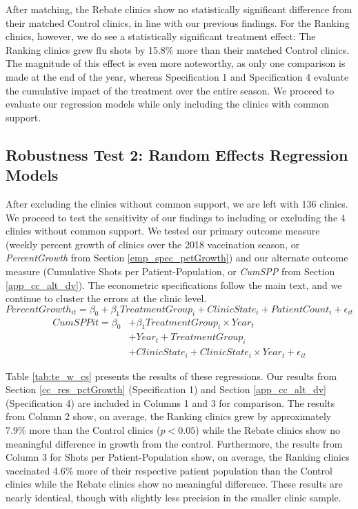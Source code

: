 After matching, the Rebate clinics show no statistically significant difference from their matched Control clinics, in line with our previous findings. For the Ranking clinics, however, we do see a statistically significant treatment effect: The Ranking clinics grew flu shots by 15.8\% more than their matched Control clinics. The magnitude of this effect is even more noteworthy, as only one comparison is made at the end of the year, whereas Specification 1 and Specification 4 evaluate the cumulative impact of the treatment over the entire season. We proceed to evaluate our regression models while only including the clinics with common support.

\subsection*{Robustness Test 2: Random Effects Regression Models} 
After excluding the clinics without common support, we are left with 136 clinics. We proceed to test the sensitivity of our findings to including or excluding the 4 clinics without common support. We tested our primary outcome measure (weekly percent growth of clinics over the 2018 vaccination season, or \textit{PercentGrowth} from Section \ref{emp_spec_pctGrowth}) and our alternate outcome measure (Cumulative Shots per Patient-Population, or \textit{CumSPP} from Section \ref{app_cc_alt_dv}). The econometric specifications follow the main text, and we continue to cluster the errors at the clinic level.
  \begin{equation} \tag{1} %
      PercentGrowth_{it} = \beta_0 + \beta_1 TreatmentGroup_i + ClinicState_i + PatientCount_i + \epsilon_{it} 
  \end{equation}
  \begin{equation} \tag{4} \begin{split}
       CumSPP{it} = \beta_0 & + \beta_1 TreatmentGroup_i \times Year_t \\
       & + Year_t + TreatmentGroup_i \\ & + ClinicState_i + ClinicState_i \times Year_t + \epsilon_{it} 
  \end{split}  \end{equation}
  

Table \ref{tab:te_w_cs} presents the results of these regressions. Our results from Section \ref{cc_res_pctGrowth} (Specification 1) and Section \ref{app_cc_alt_dv} (Specification 4) are included in Columns 1 and 3 for comparison. The results from Column 2 show, on average, the Ranking clinics grew by approximately 7.9\% more than the Control clinics ($p < 0.05$) while the Rebate clinics show no meaningful difference in growth from the control. Furthermore, the results from Column 3 for Shots per Patient-Population show, on average, the Ranking clinics vaccinated 4.6\% more of their respective patient population than the Control clinics while the Rebate clinics show no meaningful difference. These results are nearly identical, though with slightly less precision in the smaller clinic sample. 

